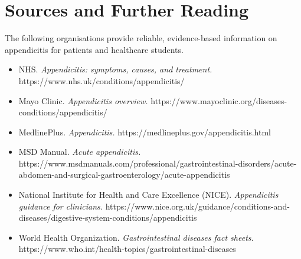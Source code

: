 \section*{Sources and Further Reading}
The following organisations provide reliable, evidence-based information on appendicitis for patients and healthcare students.

\begin{itemize}
    \item NHS. \textit{Appendicitis: symptoms, causes, and treatment.} https://www.nhs.uk/conditions/appendicitis/
    \item Mayo Clinic. \textit{Appendicitis overview.} https://www.mayoclinic.org/diseases-conditions/appendicitis/
    \item MedlinePlus. \textit{Appendicitis.} https://medlineplus.gov/appendicitis.html
    \item MSD Manual. \textit{Acute appendicitis.} https://www.msdmanuals.com/professional/gastrointestinal-disorders/acute-abdomen-and-surgical-gastroenterology/acute-appendicitis
    \item National Institute for Health and Care Excellence (NICE). \textit{Appendicitis guidance for clinicians.} https://www.nice.org.uk/guidance/conditions-and-diseases/digestive-system-conditions/appendicitis
    \item World Health Organization. \textit{Gastrointestinal diseases fact sheets.} https://www.who.int/health-topics/gastrointestinal-diseases
\end{itemize}
